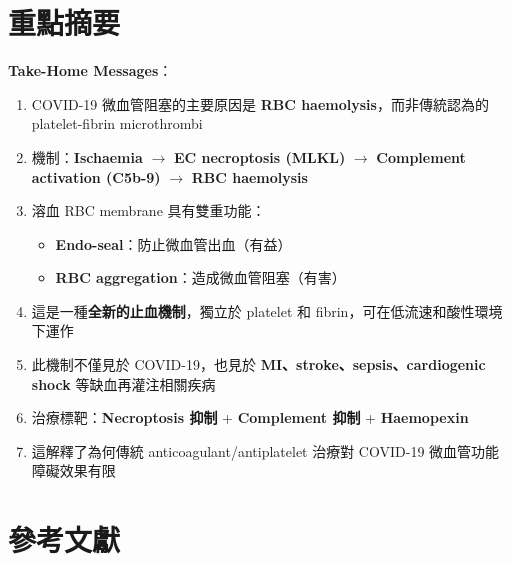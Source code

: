 \documentclass[12pt,a4paper]{article}
\begin{document}
\section{重點摘要}

\begin{importantbox}
\textbf{Take-Home Messages}：
\begin{enumerate}
    \item COVID-19 微血管阻塞的主要原因是 \textbf{RBC haemolysis}，而非傳統認為的 platelet-fibrin microthrombi
    \item 機制：\textbf{Ischaemia} $\rightarrow$ \textbf{EC necroptosis (MLKL)} $\rightarrow$ \textbf{Complement activation (C5b-9)} $\rightarrow$ \textbf{RBC haemolysis}
    \item 溶血 RBC membrane 具有雙重功能：
    \begin{itemize}
        \item \textbf{Endo-seal}：防止微血管出血（有益）
        \item \textbf{RBC aggregation}：造成微血管阻塞（有害）
    \end{itemize}
    \item 這是一種\textbf{全新的止血機制}，獨立於 platelet 和 fibrin，可在低流速和酸性環境下運作
    \item 此機制不僅見於 COVID-19，也見於 \textbf{MI、stroke、sepsis、cardiogenic shock} 等缺血再灌注相關疾病
    \item 治療標靶：\textbf{Necroptosis 抑制} + \textbf{Complement 抑制} + \textbf{Haemopexin}
    \item 這解釋了為何傳統 anticoagulant/antiplatelet 治療對 COVID-19 微血管功能障礙效果有限
\end{enumerate}
\end{importantbox}

\section{參考文獻}
\end{document}
